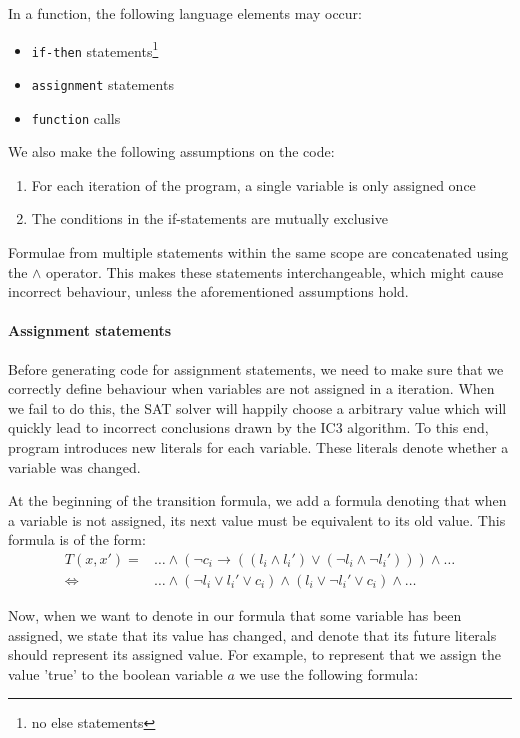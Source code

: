 \documentclass[a4paper]{article}
\begin{document}
In a function, the following language elements may occur:
\begin{itemize}
\item \texttt{if-then} statements\footnote{no else statements}
\item \texttt{assignment} statements
\item \texttt{function} calls
\end{itemize}

We also make the following assumptions on the code:
\begin{enumerate}
\item For each iteration of the program, a single variable is only assigned once
\item The conditions in the if-statements are mutually exclusive
\end{enumerate}

Formulae from multiple statements within the same scope are concatenated using the $\land$ operator. This makes these statements interchangeable, which might cause incorrect behaviour, unless the aforementioned assumptions hold.

\paragraph{Assignment statements}
Before generating code for assignment statements, we need to make sure that we correctly define behaviour when variables are not assigned in a iteration. When we fail to do this, the SAT solver will happily choose a arbitrary value which will quickly lead to incorrect conclusions drawn by the IC3 algorithm. To this end, program introduces new literals for each variable. These literals denote whether a variable was changed.

At the beginning of the transition formula, we add a formula denoting that when a variable is not assigned, its next value must be equivalent to its old value. This formula is of the form:
\begin{align*}
T(x,x') =& \ldots \land (\lnot c_i \rightarrow ((l_i \land l_i') \lor (\lnot l_i \land \lnot l_i'))) \land \ldots\\
\Leftrightarrow& \ldots \land (\lnot l_i \lor l_i' \lor c_i) \land (l_i \lor \lnot l_i' \lor c_i) \land \ldots
\end{align*}

Now, when we want to denote in our formula that some variable has been assigned, we state that its value has changed, and denote that its future literals should represent its assigned value. For example, to represent that we assign the value 'true' to the boolean variable $a$ we use the following formula:
\end{document}
